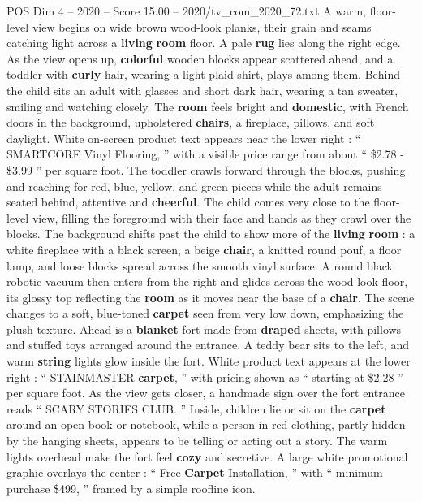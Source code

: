 \begin{textsample}{POS Dim 4 – 2020 – Score 15.00 – 2020/tv\_com\_2020\_72.txt}  \label{ex:f4_pos_015}
A warm, floor-level view begins on wide brown wood-look planks, their grain and seams catching light across a \textbf{living} \textbf{room} floor.
A pale \textbf{rug} lies along the right edge.
As the view opens up, \textbf{colorful} wooden blocks appear scattered ahead, and a toddler with \textbf{curly} hair, wearing a light plaid shirt, plays among them.
Behind the child sits an adult with glasses and short dark hair, wearing a tan sweater, smiling and watching closely.
The \textbf{room} feels bright and \textbf{domestic}, with French doors in the background, upholstered \textbf{chairs}, a fireplace, pillows, and soft daylight.
White on-screen product text appears near the lower right : “ SMARTCORE Vinyl Flooring, ” with a visible price range from about “ \$2.78 - \$3.99 ” per square foot.
The toddler crawls forward through the blocks, pushing and reaching for red, blue, yellow, and green pieces while the adult remains seated behind, attentive and \textbf{cheerful}.
The child comes very close to the floor-level view, filling the foreground with their face and hands as they crawl over the blocks.
The background shifts past the child to show more of the \textbf{living} \textbf{room} : a white fireplace with a black screen, a beige \textbf{chair}, a knitted round pouf, a floor lamp, and loose blocks spread across the smooth vinyl surface.
A round black robotic vacuum then enters from the right and glides across the wood-look floor, its glossy top reflecting the \textbf{room} as it moves near the base of a \textbf{chair}.
The scene changes to a soft, blue-toned \textbf{carpet} seen from very low down, emphasizing the plush texture.
Ahead is a \textbf{blanket} fort made from \textbf{draped} sheets, with pillows and stuffed toys arranged around the entrance.
A teddy bear sits to the left, and warm \textbf{string} lights glow inside the fort.
White product text appears at the lower right : “ STAINMASTER \textbf{carpet}, ” with pricing shown as “ starting at \$2.28 ” per square foot.
As the view gets closer, a handmade sign over the fort entrance reads “ SCARY STORIES CLUB. ” Inside, children lie or sit on the \textbf{carpet} around an open book or notebook, while a person in red clothing, partly hidden by the hanging sheets, appears to be telling or acting out a story.
The warm lights overhead make the fort feel \textbf{cozy} and secretive.
A large white promotional graphic overlays the center : “ Free \textbf{Carpet} Installation, ” with “ minimum purchase \$499, ” framed by a simple roofline icon.

\end{textsample}

